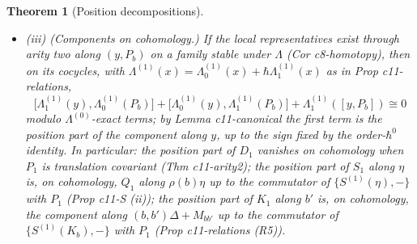 \documentclass[11pt]{article}
\numberwithin{equation}{section}
\theoremstyle{plain}
\newtheorem{theorem}{Theorem}[section]
\theoremstyle{definition}
\begin{document}
\begin{theorem}[Position decompositions]
\begin{itemize}
\item (iii) (Components on cohomology.) If the local representatives exist through arity two along $(y,P_b)$ on a family stable under $\Lambda$ (Cor c8-homotopy), then on its cocycles, with $\Lambda^{(1)}(x)=\Lambda^{(1)}_0(x)+\hbar\Lambda^{(1)}_1(x)$ as in Prop c11-relations,
\begin{equation}
\big[\Lambda^{(1)}_1(y),\Lambda^{(1)}_0(P_b)\big]+\big[\Lambda^{(1)}_0(y),\Lambda^{(1)}_1(P_b)\big]+\Lambda^{(1)}_1([y,P_b])\cong0
\label{eq:op-poscoh}
\end{equation}
modulo $\Lambda^{(0)}$-exact terms; by Lemma c11-canonical the first term is the position part of the component along $y$, up to the sign fixed by the order-$\hbar^0$ identity. In particular: the position part of $D_1$ vanishes on cohomology when $P_1$ is translation covariant (Thm c11-arity2); the position part of $S_1$ along $\eta$ is, on cohomology, $Q_1$ along $\rho(b)\eta$ up to the commutator of $\{S^{(1)}(\eta),-\}$ with $P_1$ (Prop c11-S (ii)); the position part of $K_1$ along $b'$ is, on cohomology, the component along $(b,b')\Delta+M_{bb'}$ up to the commutator of $\{S^{(1)}(K_b),-\}$ with $P_1$ (Prop c11-relations (R5)).
\end{itemize}
\end{theorem}
\end{document}
